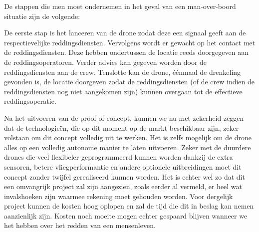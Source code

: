 De stappen die men moet ondernemen in het geval van een man-over-boord situatie zijn de volgende:

De eerste stap is het lanceren van de drone zodat deze een signaal geeft aan de respectievelijke reddingsdiensten. Vervolgens wordt er gewacht op het contact met de reddingsdiensten. Deze hebben ondertussen de locatie reeds doorgegeven aan de reddingsoperatoren. Verder advies kan gegeven worden door de reddingsdiensten aan de crew. Tenslotte kan de drone, éénmaal de drenkeling gevonden is, de locatie doorgeven zodat de reddingsdiensten (of de crew indien de reddingsdiensten nog niet aangekomen zijn) kunnen overgaan tot de effectieve reddingsoperatie.

Na het uitvoeren van de proof-of-concept, kunnen we nu met zekerheid zeggen dat de technologieën, die op dit moment op de markt beschikbaar zijn, zeker volstaan om dit concept volledig uit te werken. Het is zelfs mogelijk om de drone alles op een volledig autonome manier te laten uitvoeren. Zeker met de duurdere drones die veel flexibeler geprogrammeerd kunnen worden dankzij de extra sensoren, betere vliegperformantie en andere optionele uitbreidingen moet dit concept zonder twijfel gerealiseerd kunnen worden. Het is echter wel zo dat dit een omvangrijk project zal zijn aangezien, zoals eerder al vermeld, er heel wat invalshoeken zijn waarmee rekening moet gehouden worden. Voor dergelijk project kunnen de kosten hoog oplopen en zal de tijd die dit in beslag kan nemen aanzienlijk zijn. Kosten noch moeite mogen echter gespaard blijven wanneer we het hebben over het redden van een mensenleven.

 

